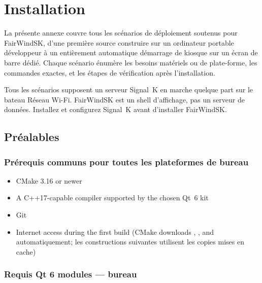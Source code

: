 \chapter{Installation}
\label{app:installation}

La présente annexe couvre tous les scénarios de déploiement soutenus pour FairWindSK,
d'une première source construire sur un ordinateur portable développeur à un entièrement automatique
démarrage de kiosque sur un écran de barre dédié.
Chaque scénario énumère les besoins matériels ou de plate-forme, les commandes exactes,
et les étapes de vérification après l'installation.

\begin{notebox}
Tous les scénarios supposent un serveur Signal~K en marche quelque part sur le bateau
Réseau Wi-Fi.
FairWindSK est un shell d'affichage, pas un serveur de données.
Installez et configurez Signal~K avant d'installer FairWindSK.
\end{notebox}

\section{Préalables}
\label{app:prerequisites}

\subsection{Prérequis communs pour toutes les plateformes de bureau}

\begin{itemize}
  \item CMake 3.16 or newer
  \item A C++17-capable compiler supported by the chosen Qt~6 kit
  \item Git
  \item Internet access during the first build
        (CMake downloads , , and 
automatiquement; les constructions suivantes utilisent les copies mises en cache)
\end{itemize}

\subsection{Requis Qt 6 modules --- bureau}

